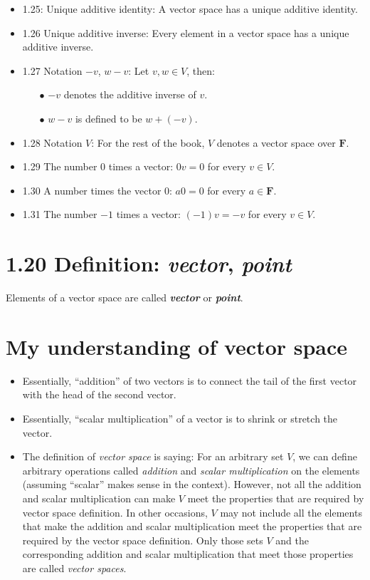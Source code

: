 \documentclass[12pt, letterpaper, oneside]{book}
\begin{document}
\begin{itemize}
  \item 1.25: Unique additive identity: A vector space has a unique additive
    identity.
  \item 1.26 Unique additive inverse: Every element in a vector space has a
    unique additive inverse.
  \item 1.27 Notation $-v$, $w - v$: Let $v, w \in V$, then:
    \begin{itemize}
      \item[$\bullet$] $-v$ denotes the additive inverse of $v$.
      \item[$\bullet$] $w - v$ is defined to be $w + (-v)$.
    \end{itemize}
  \item 1.28 Notation $V$: For the rest of the book, $V$ denotes a vector space
    over $\mathbf{F}$.
  \item 1.29 The number 0 times a vector: $0v = 0$ for every $v \in V$.
  \item 1.30 A number times the vector 0: $a0 = 0$ for every $a \in \mathbf{F}$.
  \item 1.31 The number $-1$ times a vector: $(-1)v = -v$ for every $v \in V$.
\end{itemize}

\section{1.20 Definition: \textbf{\textit{vector}}, \textbf{\textit{point}}}

Elements of a vector space are called \textbf{\textit{vector}} or
\textbf{\textit{point}}.

\section{My understanding of vector space}

\begin{itemize}
  \item Essentially, ``addition'' of two vectors is to connect the tail of the
    first vector with the head of the second vector.
  \item Essentially, ``scalar multiplication'' of a vector is to shrink or
    stretch the vector.
  \item The definition of \textit{vector space} is saying: For an arbitrary set
    $V$, we can define arbitrary operations called \textit{addition} and
    \textit{scalar multiplication} on the elements (assuming ``scalar'' makes
    sense in the context). However, not all the addition and scalar
    multiplication can make $V$ meet the properties that are required by vector
    space definition. In other occasions, $V$ may not include all the elements
    that make the addition and scalar multiplication meet the properties that
    are required by the vector space definition. Only those sets $V$ and the
    corresponding addition and scalar multiplication that meet those properties
    are called \textit{vector spaces}.
\end{itemize}
\end{document}
